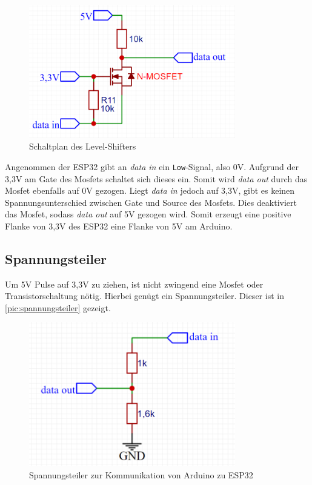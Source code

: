 \begin{figure}[h]
	\begin{center}
		\includegraphics[width=9cm]{levelShifter.PNG}
		\caption{\label{pic:levelshift}Schaltplan des Level-Shifters}
	\end{center}
\end{figure}

Angenommen der ESP32 gibt an \textit{data in} ein \texttt{Low}-Signal, also 0V. Aufgrund der 3,3V am Gate des Mosfets schaltet sich dieses ein. Somit wird \textit{data out} durch das Mosfet ebenfalls auf 0V gezogen. 
Liegt \textit{data in} jedoch auf 3,3V, gibt es keinen Spannungsunterschied zwischen Gate und Source des Mosfets. Dies deaktiviert das Mosfet, sodass \textit{data out} auf 5V gezogen wird. 
Somit erzeugt eine positive Flanke von 3,3V des ESP32 eine Flanke von 5V am Arduino.

\subsection{Spannungsteiler}
Um 5V Pulse auf 3,3V zu ziehen, ist nicht zwingend eine Mosfet oder Transistorschaltung nötig. Hierbei genügt ein Spannungsteiler. Dieser ist in \autoref{pic:spannungsteiler} gezeigt.

\begin{figure}[h]
	\begin{center}
		\includegraphics[width=9cm]{spannungsteiler.PNG}
		\caption{\label{pic:spannungsteiler} Spannungsteiler zur Kommunikation von Arduino zu ESP32}
	\end{center}
\end{figure}

